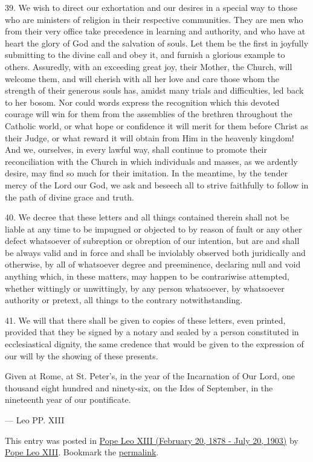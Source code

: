 39. We wish to direct our exhortation and our desires in a special way
to those who are ministers of religion in their respective communities.
They are men who from their very office take precedence in learning and
authority, and who have at heart the glory of God and the salvation of
souls. Let them be the first in joyfully submitting to the divine call
and obey it, and furnish a glorious example to others. Assuredly, with
an exceeding great joy, their Mother, the Church, will welcome them, and
will cherish with all her love and care those whom the strength of their
generous souls has, amidst many trials and difficulties, led back to her
bosom. Nor could words express the recognition which this devoted
courage will win for them from the assemblies of the brethren throughout
the Catholic world, or what hope or confidence it will merit for them
before Christ as their Judge, or what reward it will obtain from Him in
the heavenly kingdom! And we, ourselves, in every lawful way, shall
continue to promote their reconciliation with the Church in which
individuals and masses, as we ardently desire, may find so much for
their imitation. In the meantime, by the tender mercy of the Lord our
God, we ask and beseech all to strive faithfully to follow in the path
of divine grace and truth.

40. We decree that these letters and all things contained therein shall
not be liable at any time to be impugned or objected to by reason of
fault or any other defect whatsoever of subreption or obreption of our
intention, but are and shall be always valid and in force and shall be
inviolably observed both juridically and otherwise, by all of whatsoever
degree and preeminence, declaring null and void anything which, in these
matters, may happen to be contrariwise attempted, whether wittingly or
unwittingly, by any person whatsoever, by whatsoever authority or
pretext, all things to the contrary notwithstanding.

41. We will that there shall be given to copies of these letters, even
printed, provided that they be signed by a notary and sealed by a person
constituted in ecclesiastical dignity, the same credence that would be
given to the expression of our will by the showing of these presents.

Given at Rome, at St. Peter's, in the year of the Incarnation of Our
Lord, one thousand eight hundred and ninety-six, on the Ides of
September, in the nineteenth year of our pontificate.

--- Leo PP. XIII

This entry was posted in
\href{https://www.papalencyclicals.net/category/leo13}{Pope Leo XIII
(February 20, 1878 - July 20, 1903)} by
\href{https://www.papalencyclicals.net/author/popeleoxiii}{Pope Leo
XIII}. Bookmark the
\href{https://www.papalencyclicals.net/leo13/l13curae.htm}{permalink}.
